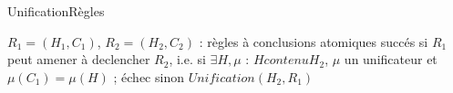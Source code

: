 \begin{center}
\begin{algorithm}[H]
\caption{UnificationR\`egles}\label{unification_regles}
\begin{algorithmic}[1]
\REQUIRE $R_{1} = (H_{1},C_{1})$, $R_{2} = (H_{2},C_{2})$ : r\`egles \`a conclusions atomiques
\ENSURE succ\'es si $R_{1}$ peut amener \`a declencher $R_{2}$, i.e. si $\exists H,\mu$ :  $H contenu H_{2}$, $\mu$ un unificateur et $\mu(C_{1}) = \mu(H)$ ; \'echec sinon
\RETURN $Unification(H_{2}, R_{1})$
\end{algorithmic}
\end{algorithm}
\end{center}

